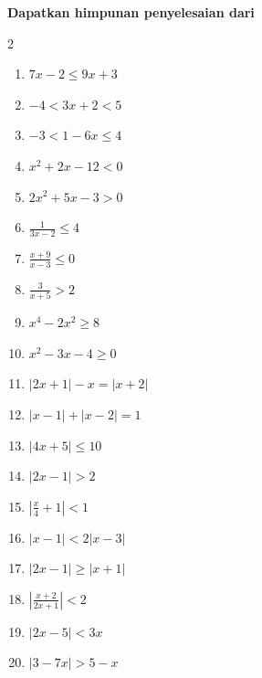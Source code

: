 \documentclass[12pt]{article}
\begin{document}
\noindent \Large \textbf{Dapatkan himpunan penyelesaian dari}
\normalsize

\begin{multicols}{2}
\begin{enumerate}
    \item $7x - 2 \leq 9x + 3$
    \item $-4 < 3x + 2 < 5$
    \item $-3 < 1 - 6x \leq 4$
    \item $x^2 + 2x - 12 < 0$
    \item $2x^2 + 5x - 3 > 0$
    \item $\displaystyle \frac{1}{3x-2} \leq 4$
    \item $\displaystyle \frac{x+9}{x-3} \leq 0$
    \item $\displaystyle \frac{3}{x+5} > 2$
    \item $x^4 - 2x^2 \geq 8$
    \item $x^2 - 3x - 4 \geq 0$
    
    \columnbreak

    \setcounter{enumi}{10}
    \item $|2x+1|-x=|x+2|$
    \item $|x-1|+|x-2|=1$
    \item $|4x + 5| \leq 10$
    \item $|2x - 1| > 2$
    \item $\displaystyle \left| \frac{x}{4} + 1 \right| < 1$
    \item $|x - 1| < 2|x - 3|$
    \item $|2x - 1| \geq |x + 1|$
    \item $\displaystyle \left| \frac{x+2}{2x+1} \right| < 2$
    \item $|2x - 5| < 3x$
    \item $|3 - 7x| > 5 - x$
\end{enumerate}
\end{multicols}
\end{document}
